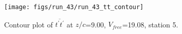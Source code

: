 \begin{figure}[H]
\centering
\texttt{[image: figs/run\_43/run\_43\_tt\_contour]}
\caption{Contour plot of $\overline{t^\prime t^\prime}$ at $z/c$=9.00, $V_{free}$=19.08, station 5.}
\label{fig:run_43_tt_contour}
\end{figure}


